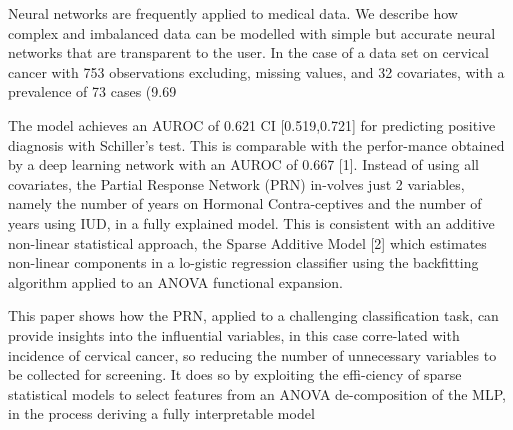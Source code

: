 Neural networks are frequently applied to medical data. We describe how complex and imbalanced data can be modelled with simple but accurate neural networks that are transparent to the user. In the case of a data set on cervical cancer with 753 observations excluding, missing values, and 32 covariates, with a prevalence of 73 cases (9.69%

     The model achieves an AUROC of 0.621 CI [0.519,0.721] for predicting positive diagnosis with Schiller's test.  This is comparable with the perfor-mance obtained by a deep learning network with an AUROC of 0.667 [1]. Instead of using all covariates, the Partial Response Network (PRN) in-volves just 2 variables, namely the number of years on Hormonal Contra-ceptives and the number of years using IUD, in a fully explained model. This is consistent with an additive non-linear statistical approach, the Sparse Additive Model [2] which estimates non-linear components in a lo-gistic regression classifier using the backfitting algorithm applied to an ANOVA functional expansion.

     This paper shows how the PRN, applied to a challenging classification task, can provide insights into the influential variables, in this case corre-lated with incidence of cervical cancer, so reducing the number of unnecessary variables to be collected for screening. It does so by exploiting the effi-ciency of sparse statistical models to select features from an ANOVA de-composition of the MLP, in the process deriving a fully interpretable model

